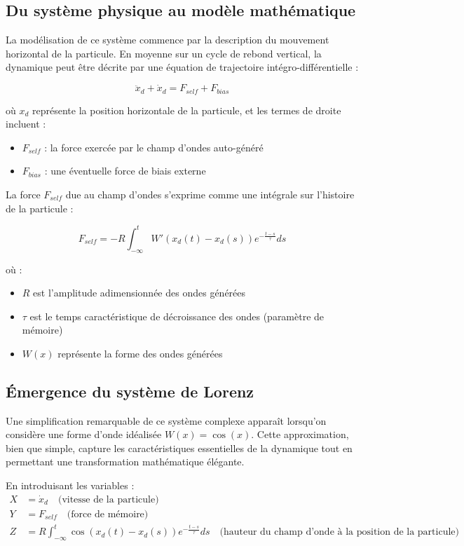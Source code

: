 \subsection{Du système physique au modèle mathématique}
La modélisation de ce système commence par la description du mouvement horizontal de la particule. En moyenne sur un cycle de rebond vertical, la dynamique peut être décrite par une équation de trajectoire intégro-différentielle :

\begin{equation}
\ddot{x}_d + \dot{x}_d = F_{self} + F_{bias}
\label{eq:mouvement_initial}
\end{equation}

où $x_d$ représente la position horizontale de la particule, et les termes de droite incluent :
\begin{itemize}
    \item $F_{self}$ : la force exercée par le champ d'ondes auto-généré
    \item $F_{bias}$ : une éventuelle force de biais externe
\end{itemize}

La force $F_{self}$ due au champ d'ondes s'exprime comme une intégrale sur l'histoire de la particule :

\begin{equation}
F_{self} = -R\int_{-\infty}^t W'(x_d(t)-x_d(s)) e^{-\frac{t-s}{\tau}} ds
\label{eq:force_memoire}
\end{equation}

où :
\begin{itemize}
    \item $R$ est l'amplitude adimensionnée des ondes générées
    \item $\tau$ est le temps caractéristique de décroissance des ondes (paramètre de mémoire)
    \item $W(x)$ représente la forme des ondes générées
\end{itemize}

\subsection{Émergence du système de Lorenz}
Une simplification remarquable de ce système complexe apparaît lorsqu'on considère une forme d'onde idéalisée $W(x) = \cos(x)$. Cette approximation, bien que simple, capture les caractéristiques essentielles de la dynamique tout en permettant une transformation mathématique élégante.

En introduisant les variables :
\begin{align}
X &= \dot{x}_d \quad \text{(vitesse de la particule)} \\
Y &= F_{self} \quad \text{(force de mémoire)} \\
Z &= R\int_{-\infty}^t \cos(x_d(t)-x_d(s)) e^{-\frac{t-s}{\tau}} ds \quad \text{(hauteur du champ d'onde à la position de la particule)}
\end{align}

